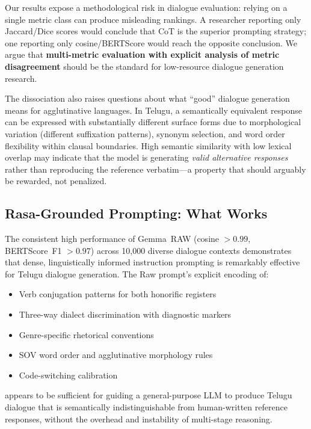 \documentclass[11pt]{article}
\begin{document}
Our results expose a methodological risk in dialogue evaluation: relying on a single metric class can produce misleading rankings. A researcher reporting only Jaccard/Dice scores would conclude that CoT is the superior prompting strategy; one reporting only cosine/BERTScore would reach the opposite conclusion. We argue that \textbf{multi-metric evaluation with explicit analysis of metric disagreement} should be the standard for low-resource dialogue generation research.

The dissociation also raises questions about what ``good'' dialogue generation means for agglutinative languages. In Telugu, a semantically equivalent response can be expressed with substantially different surface forms due to morphological variation (different suffixation patterns), synonym selection, and word order flexibility within clausal boundaries. High semantic similarity with low lexical overlap may indicate that the model is generating \textit{valid alternative responses} rather than reproducing the reference verbatim---a property that should arguably be rewarded, not penalized.

\subsection{Rasa-Grounded Prompting: What Works}
\label{subsec:rasa-works}

The consistent high performance of Gemma~RAW (cosine $> 0.99$, BERTScore~F1 $> 0.97$) across 10,000 diverse dialogue contexts demonstrates that dense, linguistically informed instruction prompting is remarkably effective for Telugu dialogue generation. The Raw prompt's explicit encoding of:

\begin{itemize}[leftmargin=*,itemsep=1pt]
    \item Verb conjugation patterns for both honorific registers
    \item Three-way dialect discrimination with diagnostic markers
    \item Genre-specific rhetorical conventions
    \item SOV word order and agglutinative morphology rules
    \item Code-switching calibration
\end{itemize}

appears to be sufficient for guiding a general-purpose LLM to produce Telugu dialogue that is semantically indistinguishable from human-written reference responses, without the overhead and instability of multi-stage reasoning.
\end{document}
